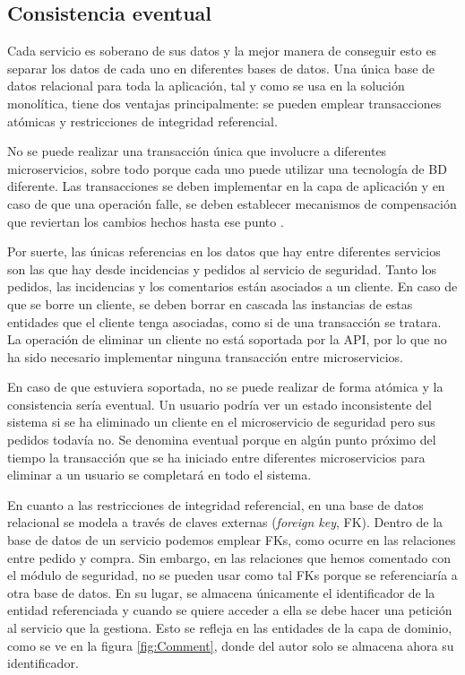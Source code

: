 \documentclass[11pt,spanish,listoffigures]{tfgetsinf}
\begin{document}
\subsection{Consistencia eventual}

Cada servicio es soberano de sus datos y la mejor manera de conseguir esto es separar los datos de cada uno en diferentes bases de datos. Una única base de datos relacional para toda la aplicación, tal y como se usa en la solución monolítica, tiene dos ventajas principalmente: se pueden emplear transacciones atómicas y restricciones de integridad referencial. 

No se puede realizar una transacción única que involucre a diferentes microservicios, sobre todo porque cada uno puede utilizar una tecnología de BD diferente. Las transacciones se deben implementar en la capa de aplicación y en caso de que una operación falle, se deben establecer mecanismos de compensación que reviertan los cambios hechos hasta ese punto \cite{DelaTorre2018}.

Por suerte, las únicas referencias en los datos que hay entre diferentes servicios son las que hay desde incidencias y pedidos al servicio de seguridad. Tanto los pedidos, las incidencias y los comentarios están asociados a un cliente. En caso de que se borre un cliente, se deben borrar en cascada las instancias de estas entidades que el cliente tenga asociadas, como si de una transacción se tratara. La operación de eliminar un cliente no está soportada por la API, por lo que no ha sido necesario implementar ninguna transacción entre microservicios.

En caso de que estuviera soportada, no se puede realizar de forma atómica y la consistencia sería eventual. Un usuario podría ver un estado inconsistente del sistema si se ha eliminado un cliente en el microservicio de seguridad pero sus pedidos todavía no. Se denomina eventual porque en algún punto próximo del tiempo la transacción que se ha iniciado entre diferentes microservicios para eliminar a un usuario se completará en todo el sistema.

En cuanto a las restricciones de integridad referencial, en una base de datos relacional se modela a través de claves externas (\textit{foreign key}, FK). Dentro de la base de datos de un servicio podemos emplear FKs, como ocurre en las relaciones entre pedido y compra. Sin embargo, en las relaciones que hemos comentado con el módulo de seguridad, no se pueden usar como tal FKs porque se referenciaría a otra base de datos. En su lugar, se almacena únicamente el identificador de la entidad referenciada y cuando se quiere acceder a ella se debe hacer una petición al servicio que la gestiona. Esto se refleja en las entidades de la capa de dominio, como se ve en la figura \ref{fig:Comment}, donde del autor solo se almacena ahora su identificador.
\end{document}
